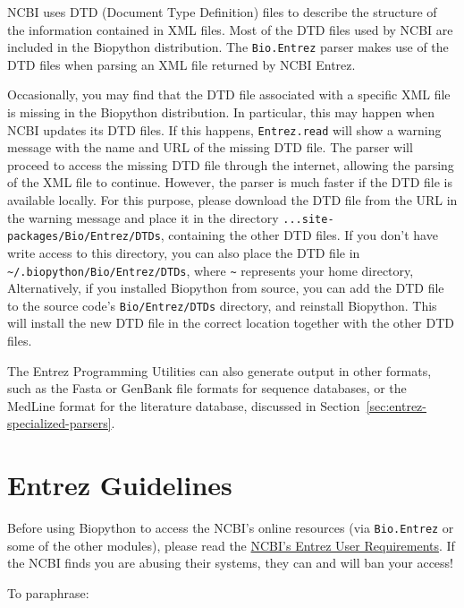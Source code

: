 \documentclass{report}
\begin{document}
NCBI uses DTD (Document Type Definition) files to describe the structure of the information contained in XML files. Most of the DTD files used by NCBI are included in the Biopython distribution. The \verb+Bio.Entrez+ parser makes use of the DTD files when parsing an XML file returned by NCBI Entrez.

Occasionally, you may find that the DTD file associated with a specific XML file is missing in the Biopython distribution. In particular, this may happen when NCBI updates its DTD files. If this happens, \verb+Entrez.read+ will show a warning message with the name and URL of the missing DTD file. The parser will proceed to access the missing DTD file through the internet, allowing the parsing of the XML file to continue.  However, the parser is much faster if the DTD file is available locally. For this purpose, please download the DTD file from the URL in the warning message and place it in the directory \verb+...site-packages/Bio/Entrez/DTDs+, containing the other DTD files.  If you don't have write access to this directory, you can also place the DTD file in \verb+~/.biopython/Bio/Entrez/DTDs+, where \verb+~+ represents your home directory, Alternatively, if you installed Biopython from source, you can add the DTD file to the source code's \verb+Bio/Entrez/DTDs+ directory, and reinstall Biopython. This will install the new DTD file in the correct location together with the other DTD files.

The Entrez Programming Utilities can also generate output in other formats, such as the Fasta or GenBank file formats for sequence databases, or the MedLine format for the literature database, discussed in Section~\ref{sec:entrez-specialized-parsers}.

\section{Entrez Guidelines}
\label{sec:entrez-guidelines}
Before using Biopython to access the NCBI's online resources (via \verb|Bio.Entrez| or some of the other modules), please read the \href{http://www.ncbi.nlm.nih.gov/entrez/query/static/eutils_help.html#UserSystemRequirements}{NCBI's Entrez User Requirements}.  If the NCBI finds you are abusing their systems, they can and will ban your access! 

To paraphrase:
\end{document}
